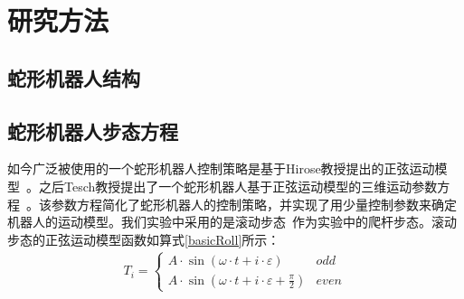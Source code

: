 \chapter{研究方法}
\label{cha:method}

\section{蛇形机器人结构}


\section{蛇形机器人步态方程}
如今广泛被使用的一个蛇形机器人控制策略是基于Hirose教授提出的正弦运动模型~\cite{HiroseSine}。之后Tesch教授提出了一个蛇形机器人基于正弦运动模型的三维运动参数方程~\cite{ChosetSine}。该参数方程简化了蛇形机器人的控制策略，并实现了用少量控制参数来确定机器人的运动模型。我们实验中采用的是滚动步态~\cite{Enner2013Motion}作为实验中的爬杆步态。滚动步态的正弦运动模型函数如算式\ref{basicRoll}所示：
\begin{eqnarray}\label{basicRoll}
T_i=\left\{
\begin{array}{lr}
A\cdot \sin (\omega \cdot t + i\cdot \varepsilon )&odd\\
A\cdot \sin (\omega \cdot t + i\cdot \varepsilon +  \frac{\pi}{2})&even
\end{array}
\right.
\end{eqnarray}
